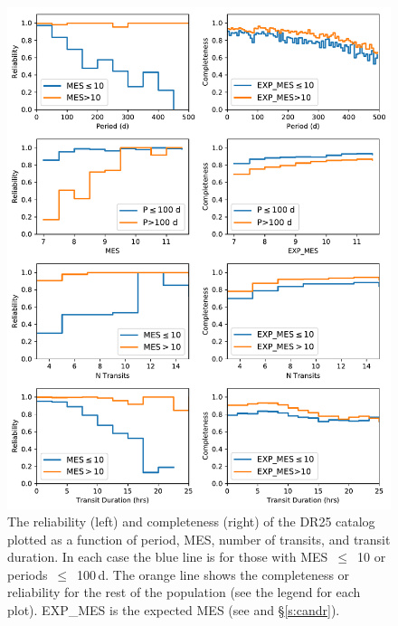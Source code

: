 \begin{figure}[hp]
 \begin{center}
  \includegraphics[width=0.94\linewidth]{f9.pdf}
  \caption{The reliability (left) and completeness (right)  of the DR25 catalog plotted as a function of period, MES, number of transits, and transit duration. In each case the blue line is for those with MES~$\leq$~10 or periods~$\leq$~100\,d. The orange line shows the completeness or reliability for the rest of the population (see the legend for each plot). EXP\_MES is the expected MES (see \citealt{Christiansen2017} and \S\ref{s:candr}).}
  \label{f:1dcompare}
 \end{center}
 \end{figure}



